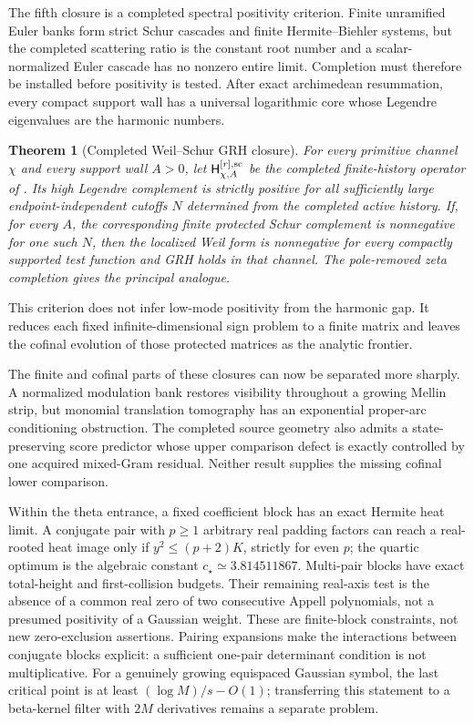 \documentclass[11pt]{article}
\newtheorem{theorem}{Theorem}[section]
\theoremstyle{definition}
\theoremstyle{remark}
\begin{document}
The fifth closure is a completed spectral positivity criterion.  Finite
unramified Euler banks form strict Schur cascades and finite
Hermite--Biehler systems, but the completed scattering ratio is the constant
root number and a scalar-normalized Euler cascade has no nonzero entire
limit.  Completion must therefore be installed before positivity is tested.
After exact archimedean resummation, every compact support wall has a universal
logarithmic core whose Legendre eigenvalues are the harmonic numbers.

\begin{theorem}[Completed Weil--Schur GRH closure]
\label{thm:intro-Weil-Schur-GRH}
For every primitive channel $\chi$ and every support wall $A>0$, let
$\mathsf H_{\chi,A}^{[r],\rm sc}$ be the completed finite-history operator of
.  Its high Legendre complement is strictly positive
for all sufficiently large endpoint-independent cutoffs $N$ determined from the completed active history.  If, for every
$A$, the corresponding finite protected Schur complement is nonnegative for
one such $N$, then the localized Weil form is nonnegative for every compactly
supported test function and GRH holds in that channel.  The pole-removed zeta
completion gives the principal analogue.
\end{theorem}

This criterion does not infer low-mode positivity from the harmonic gap.  It
reduces each fixed infinite-dimensional sign problem to a finite matrix and
leaves the cofinal evolution of those protected matrices as the analytic
frontier.

The finite and cofinal parts of these closures can now be separated more
sharply.  A normalized modulation bank restores visibility throughout a
growing Mellin strip, but monomial translation tomography has an exponential
proper-arc conditioning obstruction.  The completed source geometry also
admits a state-preserving score predictor whose upper comparison defect is
exactly controlled by one acquired mixed-Gram residual.  Neither result
supplies the missing cofinal lower comparison.

Within the theta entrance, a fixed coefficient block has an exact Hermite
heat limit.  A conjugate pair with $p\ge1$ arbitrary real padding factors
can reach a real-rooted heat image only if $y^2\le(p+2)K$, strictly for even
$p$; the quartic optimum is the algebraic constant
$c_\star\simeq3.814511867$.  Multi-pair blocks have exact total-height and
first-collision budgets.  Their remaining real-axis test is the absence of
a common real zero of two consecutive Appell polynomials, not a presumed
positivity of a Gaussian weight.  These are finite-block constraints, not
new zero-exclusion assertions.  Pairing expansions make the interactions
between conjugate blocks explicit: a sufficient one-pair determinant
condition is not multiplicative.  For a genuinely growing equispaced
Gaussian symbol, the last critical point is at least
$(\log M)/s-O(1)$; transferring this statement to a beta-kernel filter
with $2M$ derivatives remains a separate problem.
\end{document}
